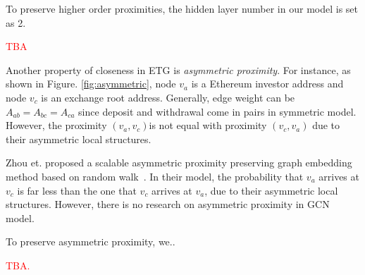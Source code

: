To preserve higher order proximities, the hidden layer number in our model is set as 2.

\textcolor{red}{TBA}

Another property of closeness in ETG is \emph{asymmetric proximity}. For instance, as shown in Figure. \ref{fig:asymmetric}, node $v_a$ is a Ethereum investor address and node $v_c$ is an exchange root address. Generally, edge weight can be $A_{ab}=A_{bc}=A_{ca}$ since deposit and withdrawal come in pairs in symmetric model. However, the proximity $(v_a,v_c)$is not equal with proximity $(v_c,v_a)$ due to their asymmetric local structures.


 Zhou et. proposed a scalable asymmetric proximity preserving graph embedding method based on random walk~\cite{zhou2017scalable}. In their model, the probability that $v_a$ arrives at $v_c$ is far less than the one that $v_c$ arrives at $v_a$, due to their asymmetric local structures. However, there is no research on asymmetric proximity in GCN model.
 
 To preserve asymmetric proximity, we..
 
 \textcolor{red}{TBA.}

